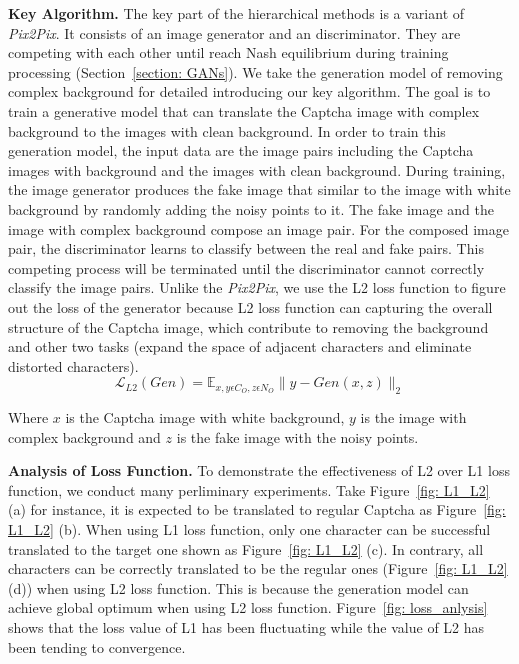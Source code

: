 \noindent \textbf{Key Algorithm.} The key part of the hierarchical methods is a variant of \emph{Pix2Pix}. It consists of an image generator and an discriminator. They are competing with each other until reach Nash equilibrium during training processing (Section~\ref{section: GANs}).
We take the generation model of removing complex background for detailed introducing our key algorithm.
The goal is to train a generative model that can translate the Captcha image with complex background to the images with clean background.
In order to train this generation model, the input data are the image pairs including the Captcha images with background and the images with clean background.
During training, the image generator produces the fake image that similar to the image with white background by randomly adding the noisy points to it. The fake image and the image with complex background compose an image pair.
For the composed image pair, the discriminator learns to classify between the real and fake pairs. This competing process will be terminated until the discriminator cannot correctly classify the image pairs.
Unlike the \emph{Pix2Pix}, we use the L2 loss function to figure out the loss of the generator because L2 loss function can capturing the overall structure of the Captcha image, which contribute to removing the background and other two tasks (expand the space of adjacent characters and eliminate distorted characters).
\begin{equation}\label{equation: L2_loss}
    \mathcal{L}_{L2}(Gen) = \mathbb{E}_{x,y \epsilon C_{O}, z \epsilon N_{O}} \|y - Gen(x, z)\|_{2}
\end{equation}

Where $x$ is the Captcha image with white background, $y$ is the image with complex background and $z$ is the fake image with the noisy points.

\noindent \textbf{Analysis of Loss Function.} To demonstrate the effectiveness of L2 over L1 loss function, we conduct many perliminary experiments. Take Figure~\ref{fig: L1_L2} (a) for instance, it is expected to be translated to regular Captcha as Figure~\ref{fig: L1_L2} (b). When using L1 loss function, only one character can be successful translated to the target one shown as Figure~\ref{fig: L1_L2} (c). In contrary, all characters can be correctly translated to be the regular ones (Figure~\ref{fig: L1_L2} (d)) when using L2 loss function. This is because the generation model can achieve global optimum when using L2 loss function. Figure~\ref{fig: loss_anlysis} shows that the loss value of L1 has been fluctuating while the value of L2 has been tending to convergence.

